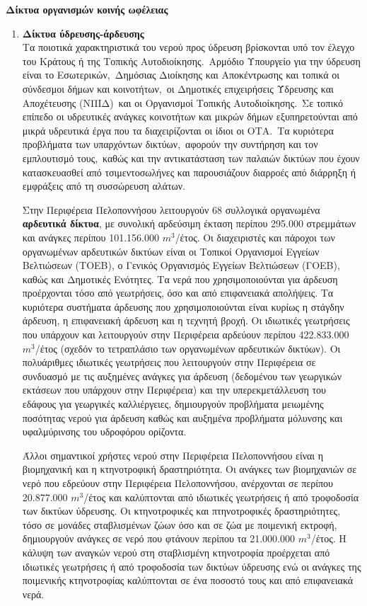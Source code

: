 \documentclass[12pt]{article}
\begin{document}
	\textbf{Δίκτυα οργανισμών κοινής ωφέλειας}
	
	\begin{enumerate}
		\item \textbf{Δίκτυα ύδρευσης-άρδευσης} \\
		Τα ποιοτικά χαρακτηριστικά του νερού προς ύδρευση βρίσκονται υπό τον έλεγχο του Κράτους ή της Τοπικής Αυτοδιοίκησης. Αρμόδιο Υπουργείο για την ύδρευση είναι το Εσωτερικών, Δημόσιας Διοίκησης και Αποκέντρωσης και τοπικά οι σύνδεσμοι δήμων και κοινοτήτων, οι Δημοτικές επιχειρήσεις Ύδρευσης και Αποχέτευσης (ΝΠΙΔ) και οι Οργανισμοί Τοπικής Αυτοδιοίκησης. Σε τοπικό επίπεδο οι υδρευτικές ανάγκες κοινοτήτων και μικρών δήμων εξυπηρετούνται από μικρά υδρευτικά έργα που τα διαχειρίζονται οι ίδιοι οι ΟΤΑ. Τα κυριότερα προβλήματα των υπαρχόντων δικτύων, αφορούν την συντήρηση και τον εμπλουτισμό τους, καθώς και την αντικατάσταση των παλαιών δικτύων που έχουν κατασκευασθεί από τσιμεντοσωλήνες και παρουσιάζουν διαρροές από διάρρηξη ή εμφράξεις από τη συσσώρευση αλάτων.
		
		Στην Περιφέρεια Πελοποννήσου λειτουργούν 68 συλλογικά οργανωμένα \textbf{αρδευτικά δίκτυα}, με συνολική αρδεύσιμη έκταση περίπου 295.000 στρεμμάτων και ανάγκες  περίπου 101.156.000 $m^3$/έτος. Οι διαχειριστές και πάροχοι των οργανωμένων αρδευτικών δικτύων είναι οι Τοπικοί Οργανισμοί Εγγείων Βελτιώσεων (ΤΟΕΒ), ο Γενικός Οργανισμός Εγγείων Βελτιώσεων (ΓΟΕΒ), καθώς και Δημοτικές Ενότητες. Τα νερά που χρησιμοποιούνται για άρδευση προέρχονται τόσο από γεωτρήσεις, όσο και από επιφανειακά απολήψεις. Τα κυριότερα συστήματα άρδευσης που χρησιμοποιούνται είναι κυρίως η στάγδην άρδευση, η επιφανειακή άρδευση και η τεχνητή βροχή. Οι ιδιωτικές γεωτρήσεις που υπάρχουν και λειτουργούν στην Περιφέρεια αρδεύουν περίπου 422.833.000 $m^3$/έτος (σχεδόν το τετραπλάσιο των οργανωμένων αρδευτικών δικτύων). Οι πολυάριθμες ιδιωτικές γεωτρήσεις που λειτουργούν στην Περιφέρεια σε συνδυασμό με τις αυξημένες ανάγκες για άρδευση (δεδομένου των γεωργικών εκτάσεων που υπάρχουν στην Περιφέρεια) και την υπερεκμετάλλευση του εδάφους για γεωργικές καλλιέργειες, δημιουργούν προβλήματα μειωμένης ποσότητας νερού για άρδευση καθώς και αυξημένα προβλήματα μόλυνσης και υφαλμύρινσης του υδροφόρου ορίζοντα.
		
		Άλλοι σημαντικοί χρήστες νερού στην Περιφέρεια Πελοποννήσου είναι η βιομηχανική και η κτηνοτροφική δραστηριότητα. Οι ανάγκες των βιομηχανιών σε νερό που εδρεύουν στην Περιφέρεια Πελοποννήσου, ανέρχονται σε περίπου 20.877.000 $m^3$/έτος και καλύπτονται από ιδιωτικές γεωτρήσεις ή από τροφοδοσία των δικτύων ύδρευσης. Οι κτηνοτροφικές και πτηνοτροφικές δραστηριότητες, τόσο σε μονάδες σταβλισμένων ζώων όσο και σε ζώα με ποιμενική εκτροφή, δημιουργούν ανάγκες σε νερό που φτάνουν περίπου τα 21.000.000 $m^3$/έτος. Η κάλυψη των αναγκών νερού στη σταβλισμένη κτηνοτροφία προέρχεται από ιδιωτικές γεωτρήσεις ή από τροφοδοσία των δικτύων ύδρευσης ενώ οι ανάγκες της ποιμενικής κτηνοτροφίας καλύπτονται σε ένα ποσοστό τους και από επιφανειακά νερά.
		

\end{enumerate}
\end{document}
